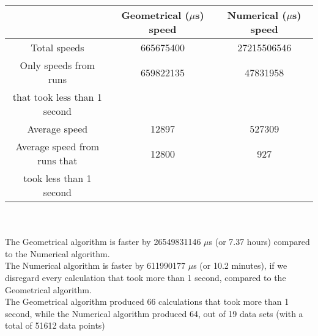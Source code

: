 \begin{tabular}[3]{c|c|c}
 & Geometrical ($\mu$s) speed & Numerical ($\mu$s) speed\\
\hline
Total speeds & 665675400 & 27215506546 \\ 
\hline 
Only speeds from runs & 659822135 & 47831958 \\ 
that took less than 1 second & & \\ 
\hline
Average speed & 12897 & 527309 \\
\hline
Average speed from runs that & 12800 & 927 \\ 
took less than 1 second & & \\ 
\end{tabular}\\ \\
The Geometrical algorithm is faster by 26549831146 $\mu$s (or 7.37 hours) compared to the Numerical algorithm.\\
The Numerical algorithm is faster by 611990177 $\mu$s (or 10.2 minutes), if we disregard every calculation that took more than 1 second, compared to the Geometrical algorithm.\\
The Geometrical algorithm produced 66 calculations that took more than 1 second, while the Numerical algorithm produced 64, out of 19 data sets (with a total of 51612 data points)\\
